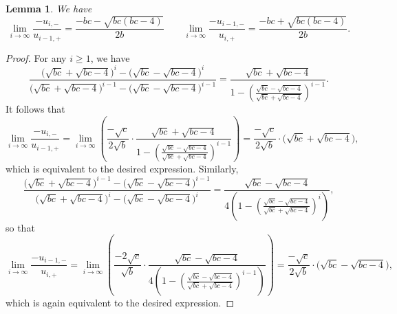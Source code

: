 \documentclass{amsart}
\newtheorem{lemma}[theorem]{Lemma}
\numberwithin{theorem}{section}
\begin{document}
  \begin{lemma}
    We have
    \[\lim_{i\to\infty} \frac{-u_{i,-}}{u_{i-1,+}}=\frac{-bc-\sqrt{bc(bc-4)}}{2b} \qquad \lim_{i\to\infty} \frac{-u_{i-1,-}}{u_{i,+}}=\frac{-bc+\sqrt{bc(bc-4)}}{2b}.\]
  \end{lemma}
  \begin{proof}
    For any $i\ge 1$, we have
    \[\frac{\big(\sqrt{bc}+\sqrt{bc-4}\big)^i-\big(\sqrt{bc}-\sqrt{bc-4}\big)^i}{\big(\sqrt{bc}+\sqrt{bc-4}\big)^{i-1}-\big(\sqrt{bc}-\sqrt{bc-4}\big)^{i-1}}=\frac{\sqrt{bc}+\sqrt{bc-4}}{1-\left(\frac{\sqrt{bc}-\sqrt{bc-4}}{\sqrt{bc}+\sqrt{bc-4}}\right)^{i-1}}.\]
    It follows that
    \[\lim_{i\to\infty} \frac{-u_{i,-}}{u_{i-1,+}} = \lim_{i\to\infty} \left( \frac{-\sqrt{c}}{2\sqrt{b}}\cdot\frac{\sqrt{bc}+\sqrt{bc-4}}{1-\left(\frac{\sqrt{bc}-\sqrt{bc-4}}{\sqrt{bc}+\sqrt{bc-4}}\right)^{i-1}} \right) = \frac{-\sqrt{c}}{2\sqrt{b}}\cdot\big(\sqrt{bc}+\sqrt{bc-4}\big),\]
    which is equivalent to the desired expression.
    Similarly, 
    \[\frac{\big(\sqrt{bc}+\sqrt{bc-4}\big)^{i-1}-\big(\sqrt{bc}-\sqrt{bc-4}\big)^{i-1}}{\big(\sqrt{bc}+\sqrt{bc-4}\big)^i-\big(\sqrt{bc}-\sqrt{bc-4}\big)^i}=\frac{\sqrt{bc}-\sqrt{bc-4}}{4\left(1-\left(\frac{\sqrt{bc}-\sqrt{bc-4}}{\sqrt{bc}+\sqrt{bc-4}}\right)^i\right)},\]
    so that
    \[\lim_{i\to\infty} \frac{-u_{i-1,-}}{u_{i,+}} = \lim_{i\to\infty} \left( \frac{-2\sqrt{c}}{\sqrt{b}}\cdot\frac{\sqrt{bc}-\sqrt{bc-4}}{4\left(1-\left(\frac{\sqrt{bc}-\sqrt{bc-4}}{\sqrt{bc}+\sqrt{bc-4}}\right)^{i-1}\right)} \right) = \frac{-\sqrt{c}}{2\sqrt{b}}\cdot\big(\sqrt{bc}-\sqrt{bc-4}\big),\]
    which is again equivalent to the desired expression.
  \end{proof}
\end{document}
